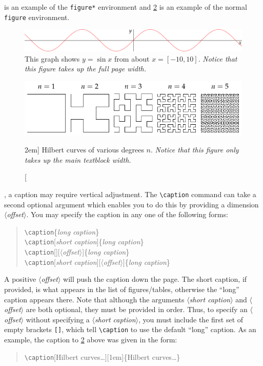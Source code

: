 \documentclass[a4paper]{tufte-handout}
\newcommand{\hlorange}[1]{\textcolor{tufte-orange}{#1}}
\newcommand{\doccmd}[1]{\hlorange{\texttt{\textbackslash#1}}}
\newcommand{\docopt}[1]{\( \langle \)\textrm{\textit{#1}}\( \rangle \)}
\newcommand{\docarg}[1]{\textrm{\textit{#1}}}
\newcommand{\docenv}[1]{\hlorange{\texttt{#1}}}
\newenvironment{docspec}
  {\begin{quotation}\ttfamily\parskip0pt\parindent0pt\ignorespaces}
  {\end{quotation}}
\begin{document}
 is an example of the \docenv{figure*} environment and \cref{fig:text-figure} is an example of the normal \docenv{figure} environment.

\begin{figure}[h]
  \includegraphics[width=\linewidth]{sine.pdf}%
  \caption[Sine graph showcasing full width figure environment]{%
    This graph shows \(y = \sin x\) from about \(x = [-10, 10]\).
    \emph{Notice that this figure takes up the full page width.}
  }\label{fig:full-width-figure}
\end{figure}

\begin{figure}
  \includegraphics{hilbert-curves.pdf}
  \caption[Hilbert curves of various degrees \(n\)][2em]{%
    Hilbert curves of various degrees \(n\).
    \emph{Notice that this figure only takes up the main textblock width.}
  }\label{fig:text-figure}
\end{figure}

, a caption may require vertical adjustment. 
The \doccmd{caption} command can take a second optional argument which enables you to do this by providing a dimension \docopt{offset}.
You may specify the caption in any one of the following forms:
\begin{docspec}
  \doccmd{caption}\{\docarg{long caption}\} \\
  \doccmd{caption}[\docarg{short caption}]\{\docarg{long caption}\} \\
  \doccmd{caption}[][\docopt{offset}]\{\docarg{long caption}\} \\
  \doccmd{caption}[\docarg{short caption}][\docopt{offset}]\{\docarg{long caption}\}
\end{docspec}
A positive \docopt{offset} will push the caption down the page.
The short caption, if provided, is what appears in the list of figures/tables, otherwise the ``long'' caption appears there.
Note that although the arguments \docopt{short caption} and \docopt{offset} are both optional, they must be provided in order. 
Thus, to specify an \docopt{offset} without specifying a \docopt{short caption}, you must include the first set of empty brackets \Verb|[]|, which tell \doccmd{caption} to use the default ``long'' caption. 
As an example, the caption to \cref{fig:text-figure} above was given in the form:
\begin{docspec}
  \doccmd{caption}[Hilbert curves\ldots][1em]\{Hilbert curves\ldots{}\}
\end{docspec}
\end{document}
